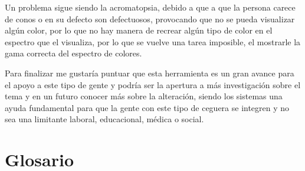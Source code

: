 \documentclass[10pt]{article}
\begin{document}
Un problema sigue siendo la acromatopsia, debido a que a que la persona carece de conos o en su defecto son defectuosos, provocando que no se pueda visualizar algún color, por lo que no hay manera de recrear algún tipo de color en el espectro que el visualiza, por lo que se vuelve una tarea imposible, el mostrarle la gama correcta del espectro de colores.

Para finalizar me gustaría puntuar que esta herramienta es un gran avance para el apoyo a este tipo de gente y podría ser la apertura a más investigación sobre el tema y en un futuro conocer más sobre la alteración, siendo los sistemas una ayuda fundamental para que la gente con este tipo de ceguera se integren y no sea una limitante laboral, educacional, médica o social.
\newpage
\section{Glosario}
\end{document}
